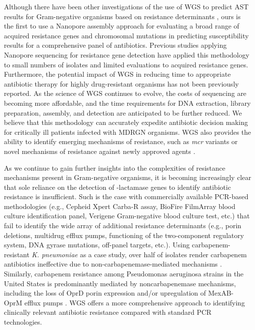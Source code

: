 Although there have been other investigations of the use of WGS to predict AST results for Gram-negative organisms based on resistance determinants \citep{Shelburne2017-dm, Cao2016-oj, Schmidt2017-ng, Lemon2017-td, Judge2015-zw, Judge2016-ds, Li2019-op, Van_der_Helm2017-ww, Xia2017-ss, Stoesser2013-se}, ours is the first to use a Nanopore assembly approach for evaluating a broad range of acquired resistance genes and chromosomal mutations in predicting susceptibility results for a comprehensive panel of antibiotics. Previous studies applying Nanopore sequencing for resistance gene detection have applied this methodology to small numbers of isolates and limited evaluations to acquired resistance genes. Furthermore, the potential impact of WGS in reducing time to appropriate antibiotic therapy for highly drug-resistant organisms has not been previously reported. As the science of WGS continues to evolve, the costs of sequencing are becoming more affordable, and the time requirements for DNA extraction, library preparation, assembly, and detection are anticipated to be further reduced. We believe that this methodology can accurately expedite antibiotic decision making for critically ill patients infected with MDRGN organisms. WGS also provides the ability to identify emerging mechanisms of resistance, such as \textit{mcr} variants or novel mechanisms of resistance against newly approved agents \citep{Haidar2017-pk, Haidar2017-rw}.

As we continue to gain further insights into the complexities of resistance mechanisms present in Gram-negative organisms, it is becoming increasingly clear that sole reliance on the detection of {\textbeta}-lactamase genes to identify antibiotic resistance is insufficient. Such is the case with commercially available PCR-based methodologies (e.g., Cepheid Xpert Carba-R assay, BioFire FilmArray blood culture identification panel, Verigene Gram-negative blood culture test, etc.) that fail to identify the wide array of additional resistance determinants (e.g., porin deletions, multidrug efflux pumps, functioning of the two-component regulatory system, DNA gyrase mutations, off-panel targets, etc.). Using carbapenem-resistant \textit{K. pneumoniae} as a case study, over half of isolates render carbapenem antibiotics ineffective due to non-carbapenemase-mediated mechanisms \citep{Tamma2017-el}. Similarly, carbapenem resistance among Pseudomonas aeruginosa strains in the United States is predominantly mediated by noncarbapenemase mechanisms, including the loss of OprD porin expression and/or upregulation of MexAB-OprM efflux pumps \citep{Lister2009-ex}. WGS offers a more comprehensive approach to identifying clinically relevant antibiotic resistance compared with standard PCR technologies.

